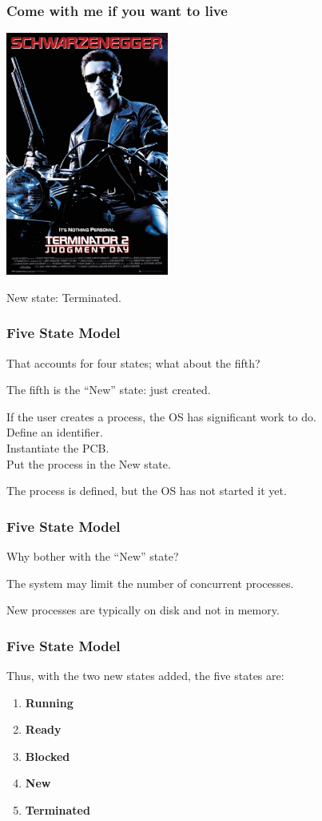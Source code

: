 \begin{frame}
	\frametitle{Come with me if you want to live}

	\begin{center}
		\includegraphics[width=0.4\textwidth]{images/judgement-day.jpg}
	\end{center}

	New state: Terminated.

\end{frame}


\begin{frame}
	\frametitle{Five State Model}
	That accounts for four states; what about the fifth?

	The fifth is the ``New'' state: just created.

	If the user creates a process, the OS has significant work to do.\\
	\quad Define an identifier.\\
	\quad Instantiate the PCB.\\
	\quad Put the process in the New state.

	The process is defined, but the OS has not started it yet.

\end{frame}

\begin{frame}
	\frametitle{Five State Model}
	Why bother with the ``New'' state?

	The system may limit the number of concurrent processes.

	New processes are typically on disk and not in memory.

\end{frame}

\begin{frame}
	\frametitle{Five State Model}

	Thus, with the two new states added, the five states are:

	\begin{enumerate}
		\item \textbf{Running}
		\item \textbf{Ready}
		\item \textbf{Blocked}
		\item \textbf{New}
		\item \textbf{Terminated}
	\end{enumerate}

\end{frame}

